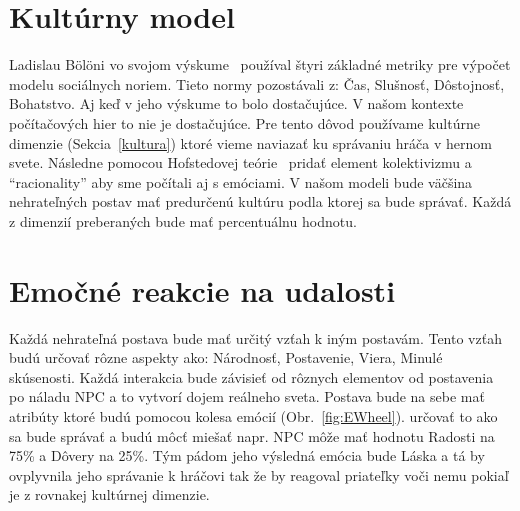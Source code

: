 \documentclass[10pt,oneside,slovak,a4paper]{article}
\begin{document}
\section{Kultúrny model}\label{model}

Ladislau B\"{o}l\"{o}ni vo svojom výskume~\cite{computationalmodel2018} používal štyri
základné metriky pre výpočet modelu sociálnych noriem. Tieto normy pozostávali z: Čas, 
Slušnosť, Dôstojnosť, Bohatstvo. Aj keď v jeho výskume to bolo dostačujúce. V našom kontexte 
počítačových hier to nie je dostačujúce. Pre tento dôvod používame kultúrne dimenzie 
(Sekcia~\ref{kultura}) ktoré vieme naviazať ku správaniu hráča v hernom svete. Následne 
pomocou Hofstedovej teórie~\cite{hofstede2010cultures} pridať element kolektivizmu a ``racionality'' 
aby sme počítali aj s emóciami. V našom modeli bude väčšina nehrateľných postav mať predurčenú 
kultúru podla ktorej sa bude správať. Každá z dimenzií preberaných bude mať percentuálnu hodnotu.

\section{Emočné reakcie na udalosti}\label{reakcie}

Každá nehrateľná postava bude mať určitý vzťah k iným postavám. Tento vzťah budú
určovať rôzne aspekty ako: Národnosť, Postavenie, Viera, Minulé skúsenosti.
Každá interakcia bude závisieť od rôznych elementov od postavenia po náladu NPC
a to vytvorí dojem reálneho sveta. Postava bude na sebe mať atribúty ktoré budú pomocou kolesa emócií
(Obr.~\ref{fig:EWheel}). určovať to ako sa bude správať a budú môcť miešať napr. NPC môže mať hodnotu
Radosti na 75\% a Dôvery na 25\%. Tým pádom jeho výsledná emócia bude Láska a tá by ovplyvnila jeho
správanie k hráčovi tak že by reagoval priateľky voči nemu pokiaľ je z rovnakej kultúrnej dimenzie.
\end{document}
